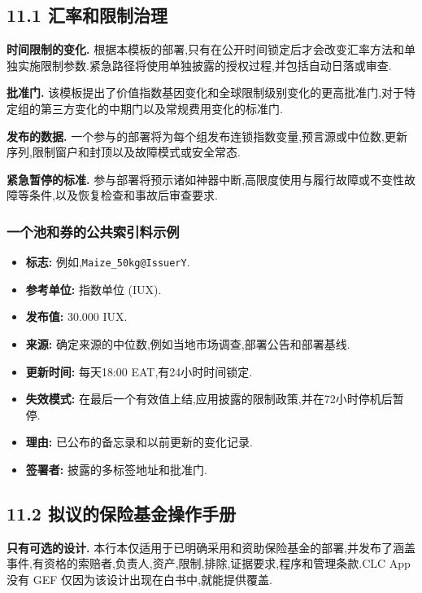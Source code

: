 \documentclass[11pt]{article}
\begin{document}
\subsection*{11.1 汇率和限制治理}

\textbf{时间限制的变化.} 根据本模板的部署,只有在公开时间锁定后才会改变汇率方法和单独实施限制参数.紧急路径将使用单独披露的授权过程,并包括自动日落或审查.

\textbf{批准门.} 该模板提出了价值指数基因变化和全球限制级别变化的更高批准门,对于特定组的第三方变化的中期门以及常规费用变化的标准门.

\textbf{发布的数据.} 一个参与的部署将为每个组发布连锁指数变量,预言源或中位数,更新序列,限制窗户和封顶以及故障模式或安全常态.

\textbf{紧急暂停的标准.} 参与部署将预示诸如神器中断,高限度使用与履行故障或不变性故障等条件,以及恢复检查和事故后审查要求.

\subsubsection*{一个池和券的公共索引料示例}

\begin{itemize}[leftmargin=*]
\item \textbf{标志:} 例如,\texttt{Maize\_50kg@IssuerY}.
\item \textbf{参考单位:} 指数单位 (IUX).
\item \textbf{发布值:} 30.000 IUX.
\item \textbf{来源:} 确定来源的中位数,例如当地市场调查,部署公告和部署基线.
\item \textbf{更新时间:} 每天18:00 EAT,有24小时时间锁定.
\item \textbf{失效模式:} 在最后一个有效值上结,应用披露的限制政策,并在72小时停机后暂停.
\item \textbf{理由:} 已公布的备忘录和以前更新的变化记录.
\item \textbf{签署者:} 披露的多标签地址和批准门.
\end{itemize}
\subsection*{11.2 拟议的保险基金操作手册}

\textbf{只有可选的设计.} 本行本仅适用于已明确采用和资助保险基金的部署,并发布了涵盖事件,有资格的索赔者,负责人,资产,限制,排除,证据要求,程序和管理条款.CLC App 没有 GEF 仅因为该设计出现在白书中,就能提供覆盖.
\end{document}
